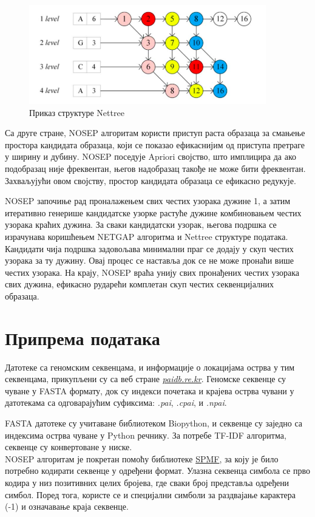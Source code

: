 \documentclass[12pt]{article}
\begin{document}
\begin{figure}[h]
    \centering
    \includegraphics[width=0.6\linewidth]{images/nettree.png}
    \caption{Приказ структуре Nettree}
    \label{fig:nettree}
\end{figure}

Са друге стране, NOSEP алгоритам користи приступ раста образаца за смањење простора кандидата образаца, који се показао ефикаснијим од приступа претраге у ширину и дубину. NOSEP поседује Apriori својство, што имплицира да ако подобразац није фреквентан, његов надобразац такође не може бити фреквентан. Захваљујући овом својству, простор кандидата образаца се ефикасно редукује.

NOSEP започиње рад проналажењем свих честих узорака дужине 1, а затим итеративно генерише кандидатске узорке растуће дужине комбиновањем честих узорака краћих дужина. За сваки кандидатски узорак, његова подршка се израчунава коришћењем NETGAP алгоритма и Nettree структуре података. Кандидати чија подршка задовољава минимални праг се додају у скуп честих узорака за ту дужину. Овај процес се наставља док се не може пронаћи више честих узорака. На крају, NOSEP враћа унију свих пронађених честих узорака свих дужина, ефикасно рударећи комплетан скуп честих секвенцијалних образаца.


\section{Припрема података}

Датотеке са геномским секвенцама, и информације о локацијама острва у тим секвенцама, прикупљени су са веб стране \textit{\href{paidb.re.kr}{paidb.re.kr}}. Геномске секвенце су чуване у FASTA формату, док су индекси почетака и крајева острва чувани у датотекама са одговарајућим суфиксима: \textit{.pai}, \textit{.cpai}, и \textit{.npai}.

FASTA датотеке су учитаване библиотеком Biopython, и секвенце су заједно са индексима острва чуване у Python речнику. За потребе TF-IDF алгоритма, секвенце су конвертоване у ниске. \\

NOSEP алгоритам је покретан помоћу библиотеке \href{https://www.philippe-fournier-viger.com/spmf}{SPMF}, за коју је било потребно кодирати секвенце у одређени формат. Улазна секвенца симбола се прво кодира у низ позитивних целих бројева, где сваки број представља одређени симбол. Поред тога, користе се и специјални симболи за раздвајање карактера (-1) и означавање краја секвенце.
\end{document}
